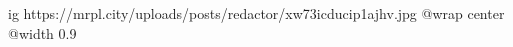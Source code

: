  
 
 
 
 

\ifcmt
  ig https://mrpl.city/uploads/posts/redactor/xw73icducip1ajhv.jpg
  @wrap center
  @width 0.9
\fi
